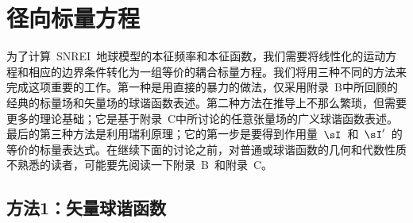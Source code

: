 \section{径向标量方程}
%
\label{sec:8.radscaleqns}

为了计算~SNREI~地球模型的本征频率和本征函数，我们需要将线性化的运动方程和相应的边界条件转化为一组等价的耦合标量方程。我们将用三种不同的方法来完成这项重要的工作。第一种是用直接的暴力的做法，仅采用附录~B中所回顾的经典的标量场和矢量场的球谐函数表述。第二种方法在推导上不那么繁琐，但需要更多的理论基础；它是基于附录~C中所讨论的任意张量场的广义球谐函数表述。最后的第三种方法是利用瑞利原理；它的第一步是要得到作用量~$\sI$~和~$\sI'$~的等价的标量表达式。在继续下面的讨论之前，对普通或球谐函数的几何和代数性质不熟悉的读者，可能要先阅读一下附录~B~和附录~C。

\subsection{方法1：矢量球谐函数}
\label{section:8.ap1}

